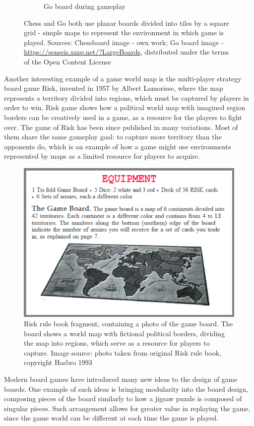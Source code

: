 \documentclass[12pt]{report}
\begin{document}
\begin{figure}[h]
\begin{subfigure}[b]{0.4\linewidth}
		\caption{Go board during gameplay} 
	\end{subfigure} 
	\caption{Chess and Go both use planar boards divided into tiles by a square grid - simple maps to represent the environment in which game is played. Sources: Chessboard image - own work; Go board image - \url{https://senseis.xmp.net/?LargeBoards}, distributed under the terms of the Open Content License }
	\label{fig:neighborhood_types}
\end{figure}
 
Another interesting example of a game world map is the multi-player strategy board game Risk, invented in 1957 by Albert Lamorisse, where the map represents a territory divided into regions, which must be captured by players in order to win. Risk game shows how a political world map with imagined region borders can be creatively used in a game, as a resource for the players to fight over. The game of Risk has been since published in many variations. Most of them share the same gameplay goal: to capture more territory than the opponents do, which is an example of how a game might use environments represented by maps as a limited resource for players to acquire.
 
\begin{figure}[h]
	\centering
	\includegraphics[width=0.5\linewidth]{images/risk-rulebook} 
	\caption{Risk rule book fragment, containing a photo of the game board. The board shows a world map with fictional political borders, dividing the map into regions, which serve as a resource for players to capture. Image source: photo taken from original Risk rule book, copyright Hasbro 1993}
	\label{fig:acrord32risk1}
\end{figure}

Modern board games have introduced many new ideas to the design of game boards. One example of such ideas is bringing modularity into the board design, composing pieces of the board similarly to how a jigsaw puzzle is composed of singular pieces. Such arrangement allows for greater value in replaying the game, since the game world can be different at each time the game is played. 
\end{document}
